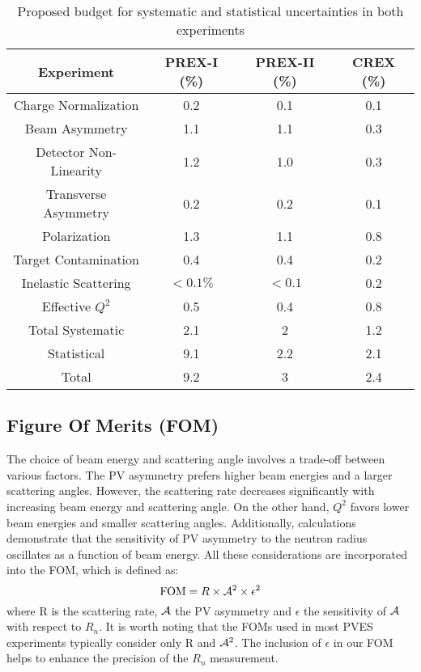 \begin{table}[!h]
    \centering
    \begin{tabular}{c| c c c}
	\hline
	Experiment  & PREX-I (\%)   & PREX-II (\%)	& CREX (\%)	\\
	\hline
	Charge Normalization	& 0.2	& 0.1	& 0.1	\\
	Beam Asymmetry		& 1.1	& 1.1	& 0.3	\\
	Detector Non-Linearity	& 1.2	& 1.0	& 0.3	\\
	Transverse Asymmetry	& 0.2	& 0.2	& 0.1	\\
	Polarization		& 1.3	& 1.1	& 0.8	\\
	Target Contamination	& 0.4	& 0.4	& 0.2	\\
	Inelastic Scattering	& $<0.1\%$  & $<0.1$    & 0.2   \\
	Effective $Q^2$		& 0.5	& 0.4	& 0.8	\\
	\hline
	Total Systematic	& 2.1	& 2	& 1.2	\\
	Statistical		& 9.1	& 2.2	& 2.1	\\
	\hline
	Total			& 9.2	& 3	& 2.4	\\
	\hline
    \end{tabular}
    \caption{Proposed budget for systematic and statistical uncertainties in both experiments 
    \cite{prex-II_proposal, crex_proposal}
    }
\end{table}


\subsection{Figure Of Merits (FOM)}
The choice of beam energy and scattering angle involves a trade-off between various
factors. The PV asymmetry prefers higher beam energies and a larger scattering angles.
However, the scattering rate decreases significantly with increasing beam energy and scattering angle.
On the other hand, $Q^2$ favors lower beam energies and smaller scattering angles. 
Additionally, calculations demonstrate that the sensitivity of PV asymmetry to the neutron radius oscillates as a function of beam energy.
All these considerations are incorporated into the FOM, which is defined as:
\begin{equation}
    \text{FOM} = R \times \mathcal{A}^2 \times \epsilon^2
\end{equation}
where R is the scattering rate, $\mathcal{A}$ the PV asymmetry and $\epsilon$ 
the sensitivity of $\mathcal{A}$ with respect to $R_n$. It is worth noting that the FOMs used in
most PVES experiments typically consider only R and $\mathcal{A}^2$. 
The inclusion of $\epsilon$ in our FOM helps to enhance the precision of the $R_n$ measurement.


